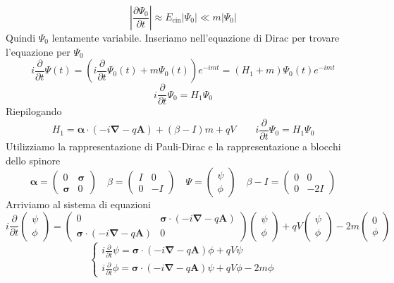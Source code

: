 $$
\left| \frac{\partial \Psi_0}{\partial t} \right|\approx E_\text{cin}|\Psi_0|\ll m|\Psi_0|
$$
Quindi $\Psi_0$ lentamente variabile. Inseriamo nell'equazione di Dirac per trovare l'equazione per $\Psi_0$
$$
i \frac{\partial}{\partial t} \Psi(t) = \left( i \frac{\partial}{\partial t}\Psi_0(t) + m \Psi_0(t) \right) e^{-imt} = (H_1 + m) \Psi_0(t) e^{-imt}
$$
$$
i \frac{\partial}{\partial t} \Psi_0 = H_1 \Psi_0
$$
Riepilogando
$$
H_1 = \boldsymbol{\alpha} \cdot (-i\boldsymbol{\nabla} - q\mathbf{A}) + (\beta - I)m + qV \qquad i \frac{\partial}{\partial t} \Psi_0 = H_1 \Psi_0
$$
Utilizziamo la rappresentazione di Pauli-Dirac e la rappresentazione a blocchi dello spinore
$$
\boldsymbol{\alpha} = \begin{pmatrix} 0 & \boldsymbol{\sigma} \\ \boldsymbol{\sigma} & 0 \end{pmatrix} \quad \beta = \begin{pmatrix} I & 0 \\ 0 & -I \end{pmatrix} \quad \Psi = \begin{pmatrix} \psi \\ \phi \end{pmatrix} \quad \beta - I = \begin{pmatrix} 0 & 0 \\ 0 & -2I \end{pmatrix}
$$
Arriviamo al sistema di equazioni
$$
i \frac{\partial}{\partial t} \begin{pmatrix} \psi \\ \phi \end{pmatrix} = \begin{pmatrix} 0 & \boldsymbol{\sigma} \cdot (-i\boldsymbol{\nabla} - q\mathbf{A}) \\ \boldsymbol{\sigma} \cdot (-i\boldsymbol{\nabla} - q\mathbf{A}) & 0 \end{pmatrix} \begin{pmatrix} \psi \\ \phi \end{pmatrix} + qV \begin{pmatrix} \psi \\ \phi \end{pmatrix} - 2m \begin{pmatrix} 0 \\ \phi \end{pmatrix}
$$
$$
\begin{cases}
i \frac{\partial}{\partial t} \psi = \boldsymbol{\sigma} \cdot (-i\boldsymbol{\nabla} - q\mathbf{A}) \phi + qV \psi \\
i \frac{\partial}{\partial t} \phi = \boldsymbol{\sigma} \cdot (-i\boldsymbol{\nabla} - q\mathbf{A}) \psi + qV \phi - 2m\phi
\end{cases}
$$
